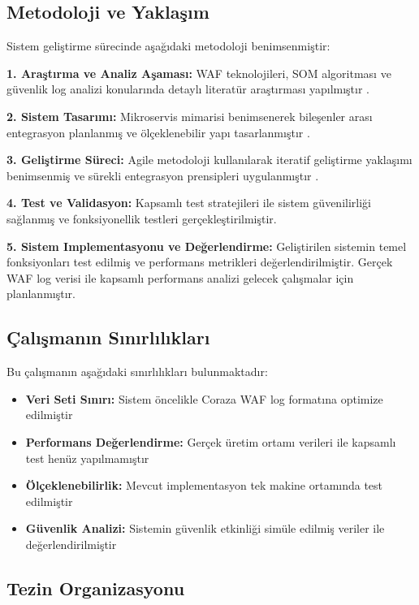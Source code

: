 \subsection{Metodoloji ve Yaklaşım}

Sistem geliştirme sürecinde aşağıdaki metodoloji benimsenmiştir:

\textbf{1. Araştırma ve Analiz Aşaması:} WAF teknolojileri, SOM algoritması ve güvenlik log analizi konularında detaylı literatür araştırması yapılmıştır \cite{som_cybersecurity2021}.

\textbf{2. Sistem Tasarımı:} Mikroservis mimarisi benimsenerek bileşenler arası entegrasyon planlanmış ve ölçeklenebilir yapı tasarlanmıştır \cite{docker2023}.

\textbf{3. Geliştirme Süreci:} Agile metodoloji kullanılarak iteratif geliştirme yaklaşımı benimsenmiş ve sürekli entegrasyon prensipleri uygulanmıştır \cite{devops_security2022}.

\textbf{4. Test ve Validasyon:} Kapsamlı test stratejileri ile sistem güvenilirliği sağlanmış ve fonksiyonellik testleri gerçekleştirilmiştir.

\newpage

\textbf{5. Sistem Implementasyonu ve Değerlendirme:} Geliştirilen sistemin temel fonksiyonları test edilmiş ve performans metrikleri değerlendirilmiştir. Gerçek WAF log verisi ile kapsamlı performans analizi gelecek çalışmalar için planlanmıştır.

\subsection{Çalışmanın Sınırlılıkları}

Bu çalışmanın aşağıdaki sınırlılıkları bulunmaktadır:

\begin{itemize}
    \item \textbf{Veri Seti Sınırı:} Sistem öncelikle Coraza WAF log formatına optimize edilmiştir
    \item \textbf{Performans Değerlendirme:} Gerçek üretim ortamı verileri ile kapsamlı test henüz yapılmamıştır
    \item \textbf{Ölçeklenebilirlik:} Mevcut implementasyon tek makine ortamında test edilmiştir
    \item \textbf{Güvenlik Analizi:} Sistemin güvenlik etkinliği simüle edilmiş veriler ile değerlendirilmiştir
\end{itemize}

\subsection{Tezin Organizasyonu}

